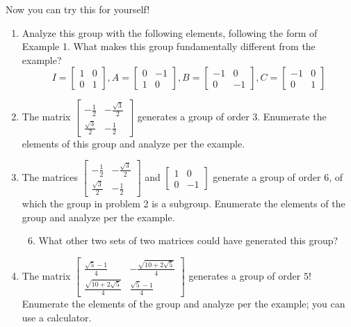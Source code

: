 \documentclass[../gatm.tex]{subfiles}
\begin{document}
Now you can try this for yourself!
\begin{enumerate}
\item Analyze this group with the following elements, following the form of Example 1. What makes this group fundamentally different from the example?
$$I=\left[\begin{array}{cc} 1 & 0 \\ 0 & 1 \end{array}\right], A=\left[\begin{array}{cc} 0 & -1 \\ 1 & 0 \end{array}\right], B=\left[\begin{array}{cc} -1 & 0 \\ 0 & -1 \end{array}\right], C=\left[\begin{array}{cc} -1 & 0 \\ 0 & 1 \end{array}\right]$$
\item The matrix $\left[\begin{array}{cc} -\frac{1}{2} & -\frac{\sqrt{3}}{2} \\ \frac{\sqrt{3}}{2} & -\frac{1}{2}\end{array}\right]$ generates a group of order $3$. Enumerate the elements of this group and analyze per the example.
\item The matrices $\left[\begin{array}{cc} -\frac{1}{2} & -\frac{\sqrt{3}}{2} \\ \frac{\sqrt{3}}{2} & -\frac{1}{2}\end{array}\right]$ and $\left[\begin{array}{cc} 1 & 0 \\ 0 & -1 \end{array}\right]$ generate a group of order $6$, of which the group in problem 2 is a subgroup. Enumerate the elements of the group and analyze per the example.
\begin{enumerate}
\setcounter{enumii}{5}
\item What other two sets of two matrices could have generated this group?
\end{enumerate}
\item The matrix $\left[\begin{array}{cc} \frac{\sqrt{5}-1}{4} & -\frac{\sqrt{10+2\sqrt{5}}}{4} \\ \frac{\sqrt{10+2\sqrt{5}}}{4} & \frac{\sqrt{5}-1}{4} \end{array}\right]$ generates a group of order $5$! Enumerate the elements of the group and analyze per the example; you can use a calculator.

\end{enumerate}
\end{document}
